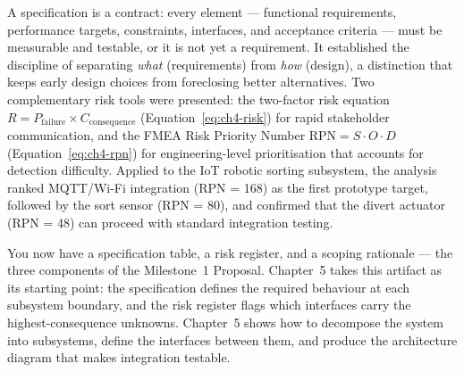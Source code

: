 A specification is a contract: every element — functional requirements, performance targets, constraints, interfaces, and acceptance criteria — must be measurable and testable, or it is not yet a requirement.
It established the discipline of separating \emph{what} (requirements) from \emph{how} (design), a distinction that keeps early design choices from foreclosing better alternatives.
Two complementary risk tools were presented: the two-factor risk equation $R = P_{\text{failure}} \times C_{\text{consequence}}$ (Equation~\eqref{eq:ch4-risk}) for rapid stakeholder communication, and the FMEA Risk Priority Number $\text{RPN} = S \cdot O \cdot D$ (Equation~\eqref{eq:ch4-rpn}) for engineering-level prioritisation that accounts for detection difficulty.
Applied to the IoT robotic sorting subsystem, the analysis ranked MQTT/Wi-Fi integration (RPN = 168) as the first prototype target, followed by the sort sensor (RPN = 80), and confirmed that the divert actuator (RPN = 48) can proceed with standard integration testing.

You now have a specification table, a risk register, and a scoping rationale — the three components of the Milestone~1 Proposal.
Chapter~5 takes this artifact as its starting point: the specification defines the required behaviour at each subsystem boundary, and the risk register flags which interfaces carry the highest-consequence unknowns.
Chapter~5 shows how to decompose the system into subsystems, define the interfaces between them, and produce the architecture diagram that makes integration testable.
